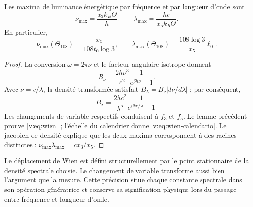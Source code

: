 \begin{proposition}
\label{v:prop:wien}
Les maxima de luminance énergétique par fréquence et par longueur d’onde sont
\begin{equation}
 \nu_{\max}=\frac{x_3 k_B\Theta}{h},\qquad
 \lambda_{\max}=\frac{hc}{x_5 k_B\Theta}.
 \label{v:eq:wien}
\end{equation}
En particulier,
\begin{equation}
 \nu_{\max}(\Theta_{108})=
 \frac{x_3}{108t_0\log3},\qquad
 \lambda_{\max}(\Theta_{108})=
 \frac{108\log3}{x_5}\ell_0.
 \label{v:eq:wien-calendario}
\end{equation}
\end{proposition}
\begin{proof}
La conversion \(\omega=2\pi\nu\) et le facteur angulaire isotrope donnent
\[
 B_\nu=\frac{2h\nu^3}{c^2}\frac1{e^{\beta h\nu}-1}.
\]
Avec \(\nu=c/\lambda\), la densité transformée satisfait
\(B_\lambda=B_\nu|d\nu/d\lambda|\) ; par conséquent,
\[
 B_\lambda=\frac{2hc^2}{\lambda^5}
 \frac1{e^{\beta hc/\lambda}-1}.
\]
Les changements de variable respectifs conduisent à \(f_3\) et \(f_5\).
Le lemme précédent prouve \eqref{v:eq:wien} ; l’échelle du calendrier
donne \eqref{v:eq:wien-calendario}. Le jacobien de densité explique que
les deux maxima correspondent à des racines distinctes :
\(\nu_{\max}\lambda_{\max}=c x_3/x_5\).
\end{proof}

Le déplacement de Wien est défini structurellement par le point
stationnaire de la densité spectrale choisie. Le changement de variable
transforme aussi bien l’argument que la mesure. Cette précision situe
chaque constante spectrale dans son opération génératrice et conserve sa
signification physique lors du passage entre fréquence et longueur d’onde.

